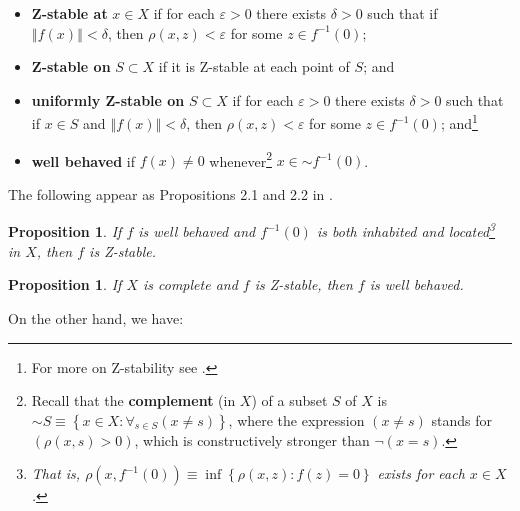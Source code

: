 \documentclass[11pt]{article}%
\newtheorem{proposition}[theorem]{Proposition}
\begin{document}
\begin{itemize}
\item[$\bullet$] \textbf{Z-stable at }$x\in X$ if for each $\varepsilon>0$
there exists $\delta>0$ such that if $\left\Vert f(x)\right\Vert <\delta$,
then $\rho(x,z)<\varepsilon$ for some $z\in f^{-1}(0)$;

\item[$\bullet$] \textbf{Z-stable on} $S\subset X$ if it is Z-stable at each
point of $S$; and

\item[$\bullet$] \textbf{uniformly Z-stable on} $S\subset X$ if for each
$\varepsilon>0$ there exists $\delta>0$ such that if $x\in S$ and $\left\Vert
f(x)\right\Vert <\delta$, then $\rho(x,z)<\varepsilon$ for some $z\in
f^{-1}(0)$; and\footnote{%
\normalfont\sf
For more on Z-stability see \cite{BDM2016}.}

\item[$\bullet$] \textbf{well behaved }if $f(x)\neq0$ whenever\footnote{%
\normalfont\sf
Recall that the \textbf{complement} (in $X$) of a subset $S$ of $X$ is $%
\mathord{\sim}%
S\equiv\left\{  x\in X:\forall_{s\in S}(x\neq s)\right\}  $, where the
expression $(x\neq s)$ stands for $(\rho(x,s)>0)$, which is constructively
stronger than $\lnot(x=s)$.} $x\in%
\mathord{\sim}%
f^{-1}(0)$.
\end{itemize}

The following appear as Propositions 2.1 and 2.2 in \cite{BDM2016}.

\begin{proposition}
\label{apr17p1}If $f$ is well behaved and $f^{-1}(0)$ is both inhabited and
located\footnote{%
\normalfont\sf
That is, $\rho(x,f^{-1}(0))\equiv\inf\left\{  \rho(x,z):f(z)=0\right\}  $
exists for each $x\in X$.} in $X$, then $f$ is Z-stable.
\end{proposition}

\begin{proposition}
\label{apr17p2}If $X$ is complete and $f$ is Z-stable, then $f$ is well behaved.
\end{proposition}

%

\noindent
On the other hand, we have:
\end{document}
